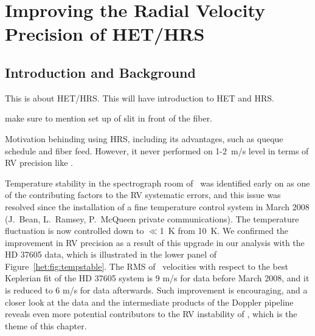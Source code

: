\chapter{Improving the Radial Velocity Precision of HET/HRS}\label{chap:het}


\section{Introduction and Background}

This is about HET/HRS. This will have introduction to HET and HRS.

make sure to mention set up of slit in front of the fiber.

Motivation behinding using HRS, including its advantages, such as
queque schedule and fiber feed. However, it never performed on 1-2~m/s
level in terms of RV precision like \keck.

Temperature stability in the spectrograph room of \hrs\ was identified
early on as one of the contributing factors to the RV systematic
errors, and this issue was resolved since the installation of a fine
temperature control system in March 2008 (J.~Bean, L.~Ramsey,
P.~McQueen private communications). The temperature fluctuation is now
controlled down to $\ll$1~K from 10~K. We confirmed the improvement in RV
precision as a result of this upgrade in our analysis with the HD
37605 data, which is illustrated in the lower panel of
Figure~\ref{het:fig:tempstable}. The RMS of \hrs\ velocities with
respect to the best Keplerian fit of the HD 37605 system is 9 m/s for
data before March 2008, and it is reduced to 6 m/s for data
afterwards. Such improvement is encouraging, and a closer look at the
data and the intermediate products of the Doppler pipeline reveals
even more potential contributors to the RV instability of \hrs, which
is the theme of this chapter.


